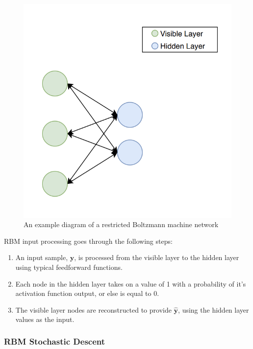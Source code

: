 \documentclass[a4paper,11pt,oneside]{article}
\theoremstyle{plain}
\theoremstyle{definition}
\begin{document}
	\begin{figure}[H]
		\centering 
		\includegraphics[scale=0.5]{images/implementation/rbm_network_diagram.png}
		\caption[Restricted Boltzmann Machines Diagram]{An example diagram of a restricted Boltzmann machine network}
		\label{figure-rbm_network_diagram}
	\end{figure}		
	
	RBM input processing goes through the following steps:
	
	\begin{enumerate}
		\item An input sample, $\mathbf{y}$, is processed from the visible layer to the hidden layer using typical feedforward functions.
		\item Each node in the hidden layer takes on a value of 1 with a probability of it's activation function output, or else is equal to 0.
		\item The visible layer nodes are reconstructed to provide $\mathbf{\hat{y}}$, using the hidden layer values as the input.
	\end{enumerate}
	
	\subsubsection{RBM Stochastic Descent}
	
\end{document}

